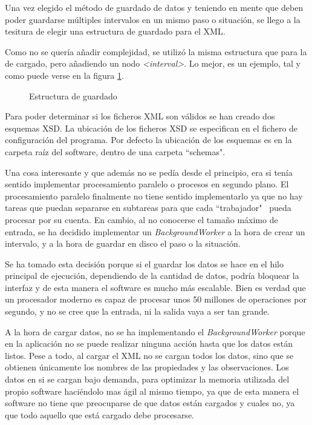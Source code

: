 Una vez elegido el m\'etodo de guardado de datos y teniendo en mente que
deben poder guardarse m\'ultiples intervalos en un mismo paso o situaci\'on, se llego a la tesitura de elegir una estructura de guardado para el XML.

Como no se quería añadir complejidad, se utilizó la misma estructura que
para la de cargado, pero añadiendo un nodo \emph{<interval>}. Lo mejor, es un
ejemplo, tal y como puede verse en la figura \ref{EstructuraGuardado}.

\begin{figure}[h]
    
    \caption[Estructura de guardado]{Estructura de guardado}
    \label{EstructuraGuardado}
\end{figure}

Para poder determinar si los ficheros XML son v\'alidos se han creado dos 
esquemas XSD. La ubicaci\'on de los ficheros XSD se especifican en el fichero 
de configuraci\'on del programa. Por defecto la ubicaci\'on de los esquemas es 
en la carpeta ra\'iz del software, dentro de una carpeta ``schemas".

Una cosa interesante y que adem\'as no se ped\'ia desde el principio, era si 
ten\'ia sentido implementar procesamiento paralelo o procesos en segundo plano. El 
procesamiento paralelo finalmente no tiene sentido implementarlo ya que no hay tareas
que puedan separarse en subtareas para que cada ``trabajador" \ pueda procesar por su
cuenta. En cambio, al no conocerse el tama\~no m\'aximo de entrada, se ha decidido
implementar un \emph{BackgroundWorker} a la hora de crear un intervalo, y a la hora
de guardar en disco el paso o la situaci\'on.

Se ha tomado esta decisi\'on porque si el guardar los datos se hace en el hilo principal
de ejecuci\'on, dependiendo de la cantidad de datos, podr\'ia bloquear la interfaz y
de esta manera el software es mucho m\'as escalable. Bien es
verdad que un procesador moderno es capaz de procesar unos 50 millones de operaciones por
segundo, y no se cree que la entrada, ni la salida vaya a ser tan grande.

A la hora de cargar datos, no se ha implementando el \emph{BackgroundWorker}
porque en la aplicaci\'on no se puede realizar ninguna acci\'on hasta que los datos est\'an 
listos. Pese a todo, al cargar el XML no se cargan todos los datos, sino que se obtienen \'unicamente
los nombres de las propiedades y las observaciones. Los datos en si se cargan bajo demanda, para optimizar la memoria
utilizada del propio software haci\'endolo mas \'agil al mismo tiempo, ya que de esta manera el software no
tiene que preocuparse de que datos est\'an cargados y cuales no, ya que todo aquello que est\'a cargado debe
procesarse.

